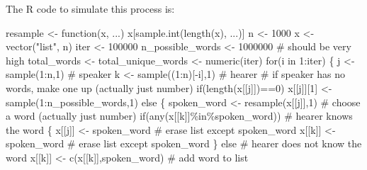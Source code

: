 \documentclass[
  letterpaper,
]{scrbook}
\newenvironment{Shaded}{\begin{snugshade}}{\end{snugshade}}
\newcommand{\CommentTok}[1]{\textcolor[rgb]{0.37,0.37,0.37}{#1}}
\newcommand{\ControlFlowTok}[1]{\textcolor[rgb]{0.00,0.23,0.31}{#1}}
\newcommand{\DecValTok}[1]{\textcolor[rgb]{0.68,0.00,0.00}{#1}}
\newcommand{\FunctionTok}[1]{\textcolor[rgb]{0.28,0.35,0.67}{#1}}
\newcommand{\NormalTok}[1]{\textcolor[rgb]{0.00,0.23,0.31}{#1}}
\newcommand{\OtherTok}[1]{\textcolor[rgb]{0.00,0.23,0.31}{#1}}
\newcommand{\SpecialCharTok}[1]{\textcolor[rgb]{0.37,0.37,0.37}{#1}}
\newcommand{\StringTok}[1]{\textcolor[rgb]{0.13,0.47,0.30}{#1}}
\begin{document}
The R code to simulate this process is:

\begin{Shaded}
\begin{Highlighting}[]
\NormalTok{resample }\OtherTok{\textless{}{-}} \ControlFlowTok{function}\NormalTok{(x, ...) x[}\FunctionTok{sample.int}\NormalTok{(}\FunctionTok{length}\NormalTok{(x), ...)]}
\NormalTok{n }\OtherTok{\textless{}{-}} \DecValTok{1000}
\NormalTok{x }\OtherTok{\textless{}{-}} \FunctionTok{vector}\NormalTok{(}\StringTok{"list"}\NormalTok{, n)}
\NormalTok{iter }\OtherTok{\textless{}{-}} \DecValTok{100000}
\NormalTok{n\_possible\_words }\OtherTok{\textless{}{-}} \DecValTok{1000000} \CommentTok{\# should be very high}
\NormalTok{total\_words }\OtherTok{\textless{}{-}}\NormalTok{ total\_unique\_words  }\OtherTok{\textless{}{-}}  \FunctionTok{numeric}\NormalTok{(iter)}
\ControlFlowTok{for}\NormalTok{(i }\ControlFlowTok{in} \DecValTok{1}\SpecialCharTok{:}\NormalTok{iter)}
\NormalTok{\{}
\NormalTok{  j }\OtherTok{\textless{}{-}} \FunctionTok{sample}\NormalTok{(}\DecValTok{1}\SpecialCharTok{:}\NormalTok{n,}\DecValTok{1}\NormalTok{) }\CommentTok{\# speaker}
\NormalTok{  k }\OtherTok{\textless{}{-}} \FunctionTok{sample}\NormalTok{((}\DecValTok{1}\SpecialCharTok{:}\NormalTok{n)[}\SpecialCharTok{{-}}\NormalTok{i],}\DecValTok{1}\NormalTok{) }\CommentTok{\# hearer}
  \CommentTok{\# if speaker has no words, make one up (actually just number)}
  \ControlFlowTok{if}\NormalTok{(}\FunctionTok{length}\NormalTok{(x[[j]])}\SpecialCharTok{==}\DecValTok{0}\NormalTok{) x[[j]][}\DecValTok{1}\NormalTok{] }\OtherTok{\textless{}{-}} \FunctionTok{sample}\NormalTok{(}\DecValTok{1}\SpecialCharTok{:}\NormalTok{n\_possible\_words,}\DecValTok{1}\NormalTok{) }\ControlFlowTok{else} 
\NormalTok{  \{}
\NormalTok{    spoken\_word }\OtherTok{\textless{}{-}} \FunctionTok{resample}\NormalTok{(x[[j]],}\DecValTok{1}\NormalTok{) }\CommentTok{\# choose a word (actually just number)}
    \ControlFlowTok{if}\NormalTok{(}\FunctionTok{any}\NormalTok{(x[[k]]}\SpecialCharTok{\%in\%}\NormalTok{spoken\_word)) }\CommentTok{\# hearer knows the word}
\NormalTok{    \{}
\NormalTok{      x[[j]] }\OtherTok{\textless{}{-}}\NormalTok{ spoken\_word }\CommentTok{\# erase list except spoken\_word}
\NormalTok{      x[[k]] }\OtherTok{\textless{}{-}}\NormalTok{ spoken\_word }\CommentTok{\# erase list except spoken\_word}
\NormalTok{    \} }\ControlFlowTok{else} \CommentTok{\# hearer does not know the word}
\NormalTok{      x[[k]] }\OtherTok{\textless{}{-}} \FunctionTok{c}\NormalTok{(x[[k]],spoken\_word)  }\CommentTok{\# add word to list}

\end{Highlighting}
\end{Shaded}
\end{document}
